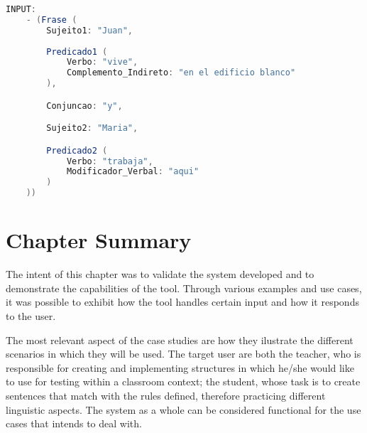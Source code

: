 \begin{center}
\begin{minipage}{13cm}
\begin{lstlisting}[language=java, basicstyle=\small, label={lst:example_complex_input2}, caption=Example of another more complex sentence input]
INPUT:
    - (Frase (
        Sujeito1: "Juan",
		
        Predicado1 (
            Verbo: "vive",
            Complemento_Indireto: "en el edificio blanco"
        ),

        Conjuncao: "y",

        Sujeito2: "Maria",

        Predicado2 (
            Verbo: "trabaja",
            Modificador_Verbal: "aqui"
        )
    ))
\end{lstlisting}
\end{minipage}
\end{center}

%
%
%
%

\section{Chapter Summary}

The intent of this chapter was to validate the system developed and to demonstrate the capabilities of the tool.
Through various examples and use cases, it was possible to exhibit how the tool handles certain input and how it responds to the user.

The most relevant aspect of the case studies are how they ilustrate the different scenarios in which they will be used.
The target user are both the teacher, who is responsible for creating and implementing structures in which he/she would like to use for testing within a classroom context;
the student, whose task is to create sentences that match with the rules defined, therefore practicing different linguistic aspects.
The system as a whole can be considered functional for the use cases that intends to deal with.

